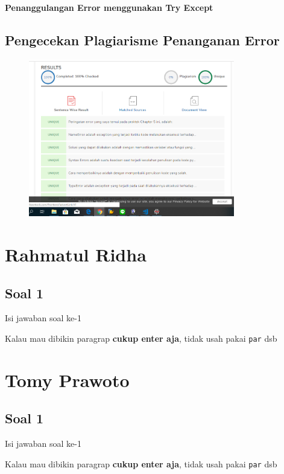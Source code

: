 \textbf{Penanggulangan Error menggunakan Try Except}


\subsection{Pengecekan Plagiarisme Penanganan Error}
\begin{figure}[H]
	\includegraphics[width=9cm]{figures/5/Praktek/1174096/Plagiarismeerror.png}
	\centering
\end{figure}

\section{Rahmatul Ridha}
\subsection{Soal 1}
Isi jawaban soal ke-1

Kalau mau dibikin paragrap \textbf{cukup enter aja}, tidak usah pakai \verb|par| dsb



\section{Tomy Prawoto}
\subsection{Soal 1}
Isi jawaban soal ke-1

Kalau mau dibikin paragrap \textbf{cukup enter aja}, tidak usah pakai \verb|par| dsb



